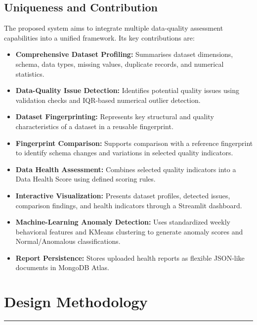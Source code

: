 \documentclass[12pt,a4paper]{report}
\begin{document}
\section{Uniqueness and Contribution}

The proposed system aims to integrate multiple data-quality assessment capabilities into a unified framework. Its key contributions are:

\begin{itemize}
    \item \textbf{Comprehensive Dataset Profiling:} Summarises dataset dimensions, schema, data types, missing values, duplicate records, and numerical statistics.
    
    \item \textbf{Data-Quality Issue Detection:} Identifies potential quality issues using validation checks and IQR-based numerical outlier detection.
    
    \item \textbf{Dataset Fingerprinting:} Represents key structural and quality characteristics of a dataset in a reusable fingerprint.
    
    \item \textbf{Fingerprint Comparison:} Supports comparison with a reference fingerprint to identify schema changes and variations in selected quality indicators.
    
    \item \textbf{Data Health Assessment:} Combines selected quality indicators into a Data Health Score using defined scoring rules.
    
    \item \textbf{Interactive Visualization:} Presents dataset profiles, detected issues, comparison findings, and health indicators through a Streamlit dashboard.
    \item \textbf{Machine-Learning Anomaly Detection:} Uses standardized weekly behavioral features and KMeans clustering to generate anomaly scores and Normal/Anomalous classifications.
    \item \textbf{Report Persistence:} Stores uploaded health reports as flexible JSON-like documents in MongoDB Atlas.
\end{itemize}



\chapter{Design Methodology}
\rule{\textwidth}{2pt}
\end{document}
